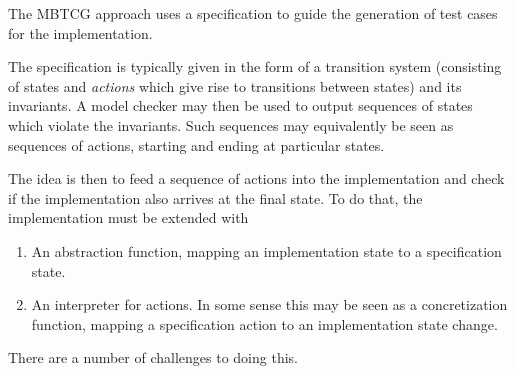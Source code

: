 \documentclass[a4paper]{article}
\begin{document}
The MBTCG approach uses a specification to guide the generation of test cases for the implementation.

The specification is typically given in the form of a transition system (consisting of states and \emph{actions} which give rise to transitions between states) and its invariants.
%
A model checker may then be used to output sequences of states which violate the invariants.
%
Such sequences may equivalently be seen as sequences of actions, starting and ending at particular states.

The idea is then to feed a sequence of actions into the implementation and check if the implementation also arrives at the final state.
%
To do that, the implementation must be extended with

\begin{enumerate}
    \item An abstraction function, mapping an implementation state to a specification state.

    \item An interpreter for actions. In some sense this may be seen as a concretization function, mapping a specification action to an implementation state change.
\end{enumerate}

There are a number of challenges to doing this.
\end{document}
